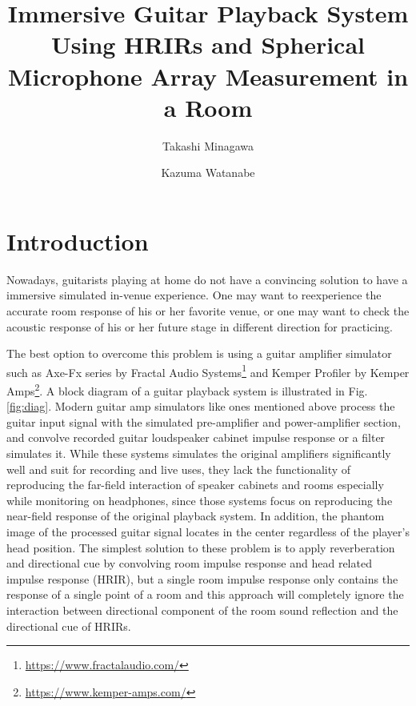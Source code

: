 \documentclass[convention,e-brief]{aesconf-current}
\title{ Immersive Guitar Playback System Using HRIRs and Spherical Microphone Array Measurement in a Room}
\author[1]{Takashi Minagawa}
\author[1]{Kazuma Watanabe}
\affil[1]{Graduate School of Design, Kyushu University}
\begin{document}

\section{Introduction}

Nowadays, guitarists playing at home do not have a convincing solution to have a immersive simulated in-venue experience.
One may want to reexperience the accurate room response of his or her favorite venue, or one may want to check the acoustic response of his or her future stage in different direction for practicing.


The best option to overcome this problem is using a guitar amplifier simulator such as Axe-Fx series by Fractal Audio Systems\footnote{\url{https://www.fractalaudio.com/}} and Kemper Profiler by Kemper Amps\footnote{\url{https://www.kemper-amps.com/}}.
A block diagram of a guitar playback system is illustrated in Fig.\ref{fig:diag}.
Modern guitar amp simulators like ones mentioned above process the guitar input signal with the simulated pre-amplifier and power-amplifier section, and convolve recorded guitar loudspeaker cabinet impulse response or a filter simulates it.
While these systems simulates the original amplifiers significantly well and suit for recording and live uses, they lack the functionality of reproducing the far-field interaction of speaker cabinets and rooms especially while monitoring on headphones, since those systems focus on reproducing the near-field response of the original playback system.
In addition, the phantom image of the processed guitar signal locates in the center regardless of the player's head position.
The simplest solution to these problem is to apply reverberation and directional cue by convolving room impulse response and head related impulse response (HRIR), but a single room impulse response only contains the response of a single point of a room and this approach will completely ignore the interaction between directional component of the room sound reflection and the directional cue of HRIRs.
\end{document}
